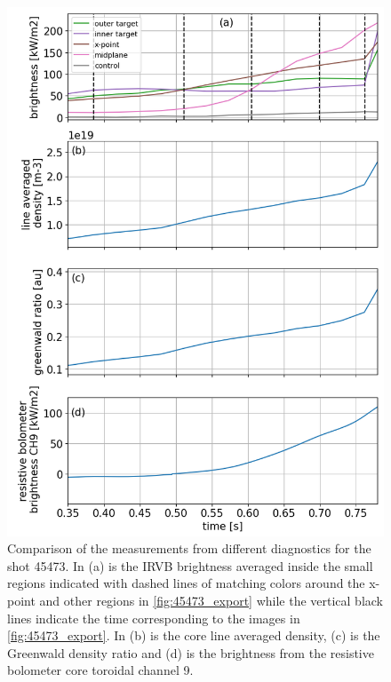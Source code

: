 \begin{figure}
	\centering
	\includegraphics[width=0.7\linewidth,trim={15 0 0 0},clip]{Chapters/chapter2/figs/45473_for_paper.png}
	\caption{Comparison of the measurements from different diagnostics for the shot 45473. In (a) is the IRVB brightness averaged inside the small regions indicated with dashed lines of matching colors around the x-point and other regions in \autoref{fig:45473_export} while the vertical black lines indicate the time corresponding to the images in \autoref{fig:45473_export}. In (b) is the core line averaged density, (c) is the Greenwald density ratio and (d) is the brightness from the resistive bolometer core toroidal channel 9.}
	\label{fig:45473_plots}
\end{figure}

